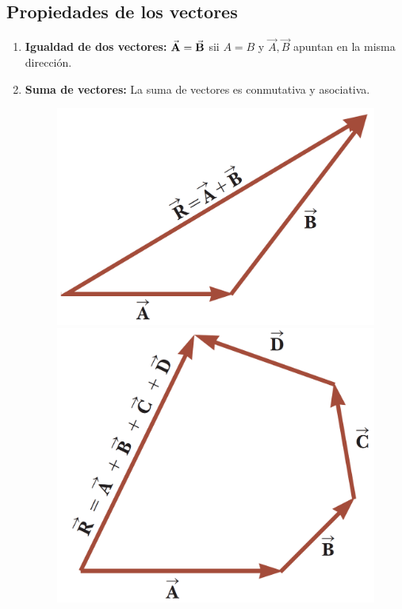   \subsection{Propiedades de los vectores}
    \begin{enumerate}
      \item \textbf{Igualdad de dos vectores:} $\vec{\mathbf{A}} = \vec{\mathbf{B}}$ sii $A = B$ y $\vec{A}, \vec{B}$ apuntan en la misma
        dirección.
      \item \textbf{Suma de vectores:} La suma de vectores es conmutativa y asociativa.
        \begin{figure}[H]
          \centering
          \includegraphics[scale=0.25]{1/graphics_3/figure_1a}
          \endminipage\hspace{0.8mm}
          \centering
          \includegraphics[scale=0.2]{1/graphics_3/figure_1b}

\end{figure}
\end{enumerate}
